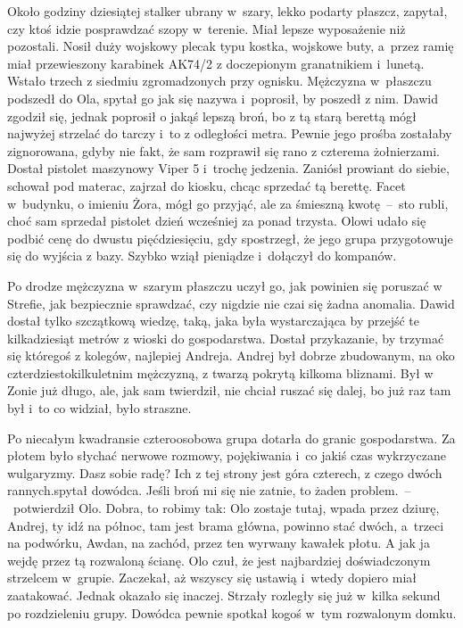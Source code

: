 \documentclass[../MAIN.tex]{subfiles}
\begin{document}
Około godziny dziesiątej stalker ubrany w~sza\-ry, lekko podarty płaszcz, zapytał, czy ktoś idzie posprawdzać szopy w~terenie. Miał lepsze wyposażenie niż
pozostali. Nosił duży wojskowy plecak typu kostka, wojskowe buty, a~przez ramię
miał przewieszony karabinek AK74/2 z doczepionym granatnikiem i~lunetą. Wstało
trzech z siedmiu zgromadzonych przy ognisku.
Mężczyzna w~płaszczu podszedł do
Ola, spytał go jak się nazywa i~poprosił, by poszedł z nim. Dawid zgodził się,
jednak poprosił o jakąś lepszą broń, bo z tą starą berettą mógł najwyżej
strzelać do tarczy i~to z odległości metra. Pewnie jego prośba zostałaby
zignorowana, gdyby nie fakt, że sam rozprawił się rano z czterema żołnierzami.
Dostał pistolet maszynowy Viper 5 i~trochę jedzenia.
Zaniósł prowiant do siebie, schował pod materac, zajrzał do kiosku, chcąc
sprzedać tą berettę. Facet w~budynku, o imieniu Żora, mógł go przyjąć, ale za
śmieszną kwotę~--~sto rubli, choć sam sprzedał pistolet dzień wcześniej za
ponad trzysta. Olowi udało się podbić cenę do dwustu pięćdziesięciu, gdy
spostrzegł, że jego grupa przygotowuje się do wyjścia z bazy. Szybko wziął
pieniądze i~dołączył do kompanów.

Po drodze mężczyzna w~szarym płaszczu uczył go, jak powinien się poruszać w
Strefie, jak bezpiecznie sprawdzać, czy nigdzie nie czai się żadna anomalia.
Dawid dostał tylko szczątkową wiedzę, taką, jaka była wystarczająca by przejść
te kilkadziesiąt metrów z wioski do gospodarstwa.
Dostał przykazanie, by trzymać
się któregoś z kolegów, najlepiej Andreja. Andrej był dobrze zbudowanym, na oko
czterdziestokilkuletnim mężczyzną, z twarzą pokrytą kilkoma bliznami. Był w
Zonie już długo, ale, jak sam twierdził, nie chciał ruszać się dalej, bo już raz
tam był i~to co widział, było straszne.

Po niecałym kwadransie czteroosobowa grupa dotarła do granic gospodarstwa. Za
płotem było słychać nerwowe rozmowy, pojękiwania i~co jakiś czas wykrzyczane
wulgaryzmy.
\sd
\xx Dasz sobie radę? Ich z tej strony jest góra czterech, z czego dwóch rannych.\x spytał dowódca.
\xx Jeśli broń mi się nie zatnie, to żaden problem.~--~potwierdził Olo.
\xx Dobra, to robimy tak: Olo zostaje tutaj, wpada przez dziurę, Andrej, ty idź
na północ, tam jest brama główna, powinno stać dwóch, a~trzeci na podwórku,
Awdan, na zachód, przez ten wyrwany kawałek płotu. A ja\3k ja wejdę przez tą
rozwaloną ścianę.
\qm
Olo czuł, że jest najbardziej doświadczonym strzelcem w~grupie. Zaczekał, aż
wszyscy się ustawią i~wtedy dopiero miał zaatakować. Jednak okazało się inaczej.
Strzały rozległy się już w~kilka sekund po rozdzieleniu grupy. Dowódca pewnie
spotkał kogoś w~tym rozwalonym domku.%
\end{document}
